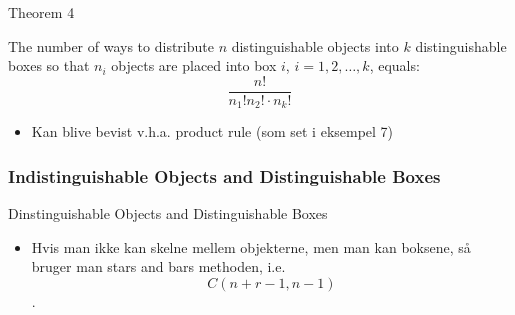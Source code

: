 \documentclass{beamer}
\begin{document}
\begin{frame}{Theorem 4}
   \begin{theorem}
       The number of ways to distribute $n$ distinguishable objects into $k$ distinguishable boxes so that $n_i$ objects are placed into box $i$, $i = 1, 2, \ldots, k$, equals:
       $$\frac{n!}{n_1!n_2! \cdot n_k!}$$
   \end{theorem} 
   \begin{itemize}
       \item Kan blive bevist v.h.a. product rule (som set i eksempel 7)
   \end{itemize}
\end{frame}

\subsubsection{Indistinguishable Objects and Distinguishable Boxes}
\begin{frame}{Dinstinguishable Objects and Distinguishable Boxes}
\begin{itemize}
    \item Hvis man ikke kan skelne mellem objekterne, men man kan boksene, så bruger man stars and bars methoden, i.e. $$C(n+r-1,n-1)$$.
\end{itemize}
\end{frame}
\end{document}
